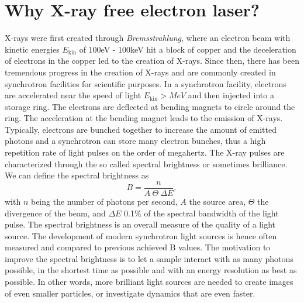 \section{Why X-ray free electron laser?}\label{sec:xfel}
X-rays were first created through \textit{Bremsstrahlung}, where an electron beam with kinetic energies $E_{\text{kin}}$ of 100eV - 100keV hit a block of copper and the deceleration of electrons in the copper led to the creation of X-rays. Since then, there has been tremendous progress in the creation of X-rays and are commonly created in synchrotron facilities for scientific purposes. In a synchrotron facility, electrons are accelerated near the speed of light $E_{\text{kin}}>MeV$ and then injected into a storage ring. The electrons are deflected at bending magnets to circle around the ring. The acceleration at the bending magnet leads to the emission of X-rays. Typically, electrons are bunched together to increase the amount of emitted photons and a synchrotron can store many electron bunches, thus a high repetition rate of light pulses on the order of megahertz. The X-ray pulses are characterized through the so called spectral brightness \cite{Mills-2005-IUCR} or sometimes brilliance. We can define the spectral brightness as \cite{Als-Nielson-2011-JWS}
\begin{equation}
B = \frac{n}{A\ \Theta\ \Delta\! E},
\label{eq:spectral-brightness}
\end{equation}
with $n$ being the number of photons per second, $A$ the source area, $\Theta$ the divergence of the beam, and $\Delta\! E$ 0.1\% of the spectral bandwidth of the light pulse. The spectral brightness is an overall measure of the quality of a light source. The development of modern synchrotron light sources is hence often measured and compared to previous achieved B values. The motivation to improve the spectral brightness is to let a sample interact with as many photons possible, in the shortest time as possible and with an energy resolution as best as possible. In other words, more brilliant light sources are needed to create images of even smaller particles, or investigate dynamics that are even faster.
